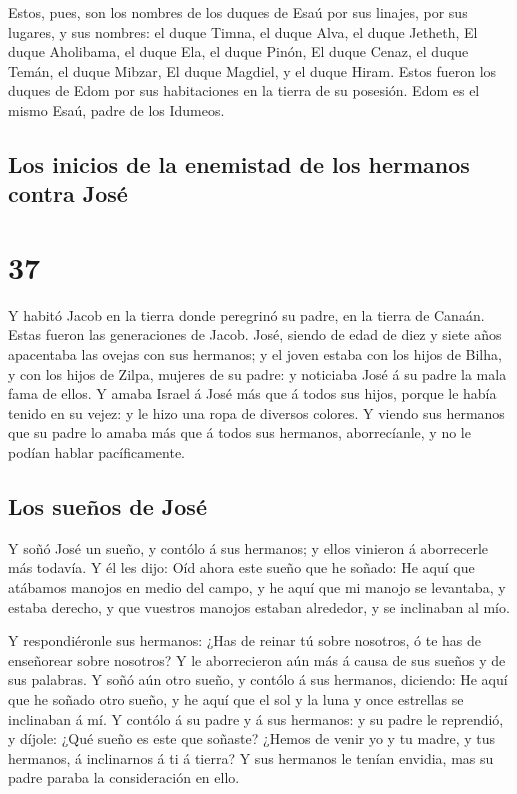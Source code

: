  Estos, pues, son los nombres de los duques de Esaú por
sus linajes, por sus lugares, y sus nombres: el duque Timna, el duque
Alva, el duque Jetheth,  El duque Aholibama, el duque
Ela, el duque Pinón,  El duque Cenaz, el duque Temán, el
duque Mibzar,  El duque Magdiel, y el duque Hiram. Estos
fueron los duques de Edom por sus habitaciones en la tierra de su
posesión. Edom es el mismo Esaú, padre de los Idumeos.

\hypertarget{los-inicios-de-la-enemistad-de-los-hermanos-contra-josuxe9}{%
\subsection{Los inicios de la enemistad de los hermanos contra
José}\label{los-inicios-de-la-enemistad-de-los-hermanos-contra-josuxe9}}

\hypertarget{section-36}{%
\section{37}\label{section-36}}

 Y habitó Jacob en la tierra donde peregrinó su padre, en
la tierra de Canaán.  Estas fueron las generaciones de
Jacob. José, siendo de edad de diez y siete años apacentaba las ovejas
con sus hermanos; y el joven estaba con los hijos de Bilha, y con los
hijos de Zilpa, mujeres de su padre: y noticiaba José á su padre la mala
fama de ellos.  Y amaba Israel á José más que á todos sus
hijos, porque le había tenido en su vejez: y le hizo una ropa de
diversos colores.  Y viendo sus hermanos que su padre lo
amaba más que á todos sus hermanos, aborrecíanle, y no le podían hablar
pacíficamente.

\hypertarget{los-sueuxf1os-de-josuxe9}{%
\subsection{Los sueños de José}\label{los-sueuxf1os-de-josuxe9}}

 Y soñó José un sueño, y contólo á sus hermanos; y ellos
vinieron á aborrecerle más todavía.  Y él les dijo: Oíd
ahora este sueño que he soñado:  He aquí que atábamos
manojos en medio del campo, y he aquí que mi manojo se levantaba, y
estaba derecho, y que vuestros manojos estaban alrededor, y se
inclinaban al mío.

 Y respondiéronle sus hermanos: ¿Has de reinar tú sobre
nosotros, ó te has de enseñorear sobre nosotros? Y le aborrecieron aún
más á causa de sus sueños y de sus palabras.  Y soñó aún
otro sueño, y contólo á sus hermanos, diciendo: He aquí que he soñado
otro sueño, y he aquí que el sol y la luna y once estrellas se
inclinaban á mí.  Y contólo á su padre y á sus hermanos:
y su padre le reprendió, y díjole: ¿Qué sueño es este que soñaste?
¿Hemos de venir yo y tu madre, y tus hermanos, á inclinarnos á ti á
tierra?  Y sus hermanos le tenían envidia, mas su padre
paraba la consideración en ello.

